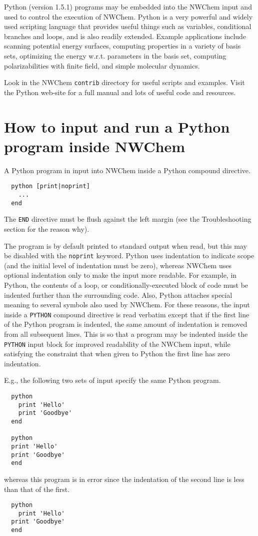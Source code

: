 \label{sec:python}

Python (version 1.5.1) programs may be embedded into the NWChem input
and used to control the execution of NWChem.  Python is a very
powerful and widely used scripting language that provides useful
things such as variables, conditional branches and loops, and is also
readily extended.  Example applications include scanning potential
energy surfaces, computing properties in a variety of basis sets,
optimizing the energy w.r.t. parameters in the basis set, computing
polarizabilities with finite field, and simple molecular dynamics.

Look in the NWChem \verb+contrib+ directory for useful scripts and
examples. Visit the Python web-site 
for a full manual and lots of useful code and resources.  

\section{How to input and run a Python program inside NWChem}

A Python program in input into NWChem inside a Python compound directive.
\begin{verbatim}
  python [print|noprint]
    ...
  end
\end{verbatim}
The \verb+END+ directive must be flush against the left
margin (see the Troubleshooting section for the reason why).

The program is by default printed to standard output when read, but
this may be disabled with the \verb+noprint+ keyword.  Python uses
indentation to indicate scope (and the initial level of indentation
must be zero), whereas NWChem uses optional indentation only to make
the input more readable.  For example, in Python, the contents of a
loop, or conditionally-executed block of code must be indented further
than the surrounding code.  Also, Python attaches special meaning to
several symbols also used by NWChem.  For these reasons, the input
inside a \verb+PYTHON+ compound directive is read verbatim except that
if the first line of the Python program is indented, the same amount
of indentation is removed from all subsequent lines.  This is so that
a program may be indented inside the \verb+PYTHON+ input block for
improved readability of the NWChem input, while satisfying the
constraint that when given to Python the first line has zero
indentation.

E.g., the following two sets of input specify the same Python program.
\begin{verbatim}
  python
    print 'Hello'
    print 'Goodbye'
  end

  python
  print 'Hello'
  print 'Goodbye'
  end
\end{verbatim}
whereas this program is in error since the indentation of the second
line is less than that of the first.
\begin{verbatim}
  python
    print 'Hello'
  print 'Goodbye'
  end
\end{verbatim}

